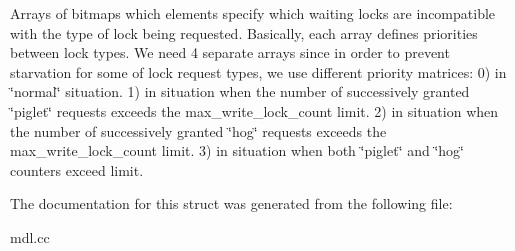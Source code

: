 Arrays of bitmaps which elements specify which waiting locks are incompatible with the type of lock being requested. Basically, each array defines priorities between lock types. We need 4 separate arrays since in order to prevent starvation for some of lock request types, we use different priority matrices\+: 0) in \char`\"{}normal\char`\"{} situation. 1) in situation when the number of successively granted \char`\"{}piglet\char`\"{} requests exceeds the max\+\_\+write\+\_\+lock\+\_\+count limit. 2) in situation when the number of successively granted \char`\"{}hog\char`\"{} requests exceeds the max\+\_\+write\+\_\+lock\+\_\+count limit. 3) in situation when both \char`\"{}piglet\char`\"{} and \char`\"{}hog\char`\"{} counters exceed limit. 

The documentation for this struct was generated from the following file\+:\begin{DoxyCompactItemize}
\item 
mdl.\+cc\end{DoxyCompactItemize}
